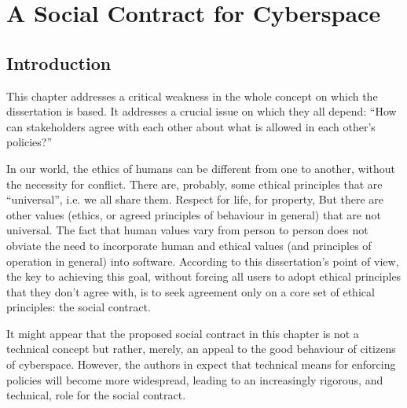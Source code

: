 \chapter{A Social Contract for Cyberspace}
\section{Introduction}
This chapter addresses a critical
weakness in the whole concept on which the dissertation is based. It
addresses a crucial issue on which they all depend: ``How can stakeholders
agree with each other about what is allowed in each other's policies?''

In our world, the ethics of humans can be different from one to another,
without the necessity for conflict. There are, probably, some ethical
principles that are ``universal'', i.e. we all share them. Respect for life,
for property, But there are other values (ethics, or agreed principles of behaviour in general) 
that are not universal. The fact that human values vary from person to person does not obviate
the need to incorporate human and ethical values (and principles
of operation in general) into software. According to this dissertation's point of view, the
key to achieving this goal, without forcing all users to adopt ethical
principles that they don't agree with, is to seek agreement only on a
core set of ethical principles: the social contract.

It might appear that the proposed social contract in this chapter is not a
technical concept but rather, merely, an appeal to the good behaviour of
citizens of cyberspace. However, the authors in \cite{sheniar2021social}
expect that technical means for enforcing policies will become more
widespread, leading to an increasingly rigorous, and technical, role
for the social contract.
